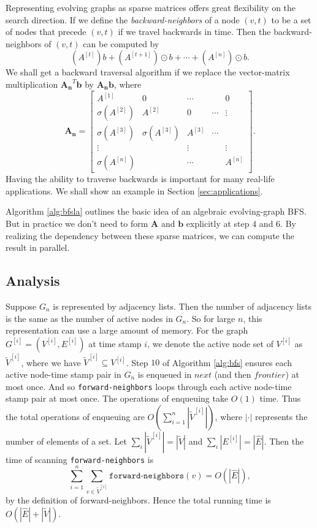 \documentclass[11pt,conference,compsocconf]{IEEEtran}
\theoremstyle{definition}
\begin{document}
Representing evolving graphs as sparse matrices offers great flexibility
on the search direction. If we define the \emph{backward-neighbors} of a
node $(v,t)$ to be a set of nodes that precede $(v,t)$ if we travel backwards
in time. Then the backward-neighbors of $(v,t)$ can be computed by
\begin{equation}
\label{eq:backward}
(A^{[t]})b + (A^{[t+1]})\odot b + \cdots + (A^{[n]})\odot b.
\end{equation}
We shall get a backward traversal algorithm if we replace
the vector-matrix multiplication $\bm{A_n}^T\bm{b}$
by $\bm{A_n}\bm{b}$, where
\[
\bm{A_n} =
\begin{bmatrix}
A^{[1]} &   0            & \cdots  &  & 0 \\
\sigma(A^{[2]}) & A^{[2]} & 0         &\cdots  & \vdots \\
\sigma(A^{[3]}) & \sigma(A^{[3]}) & A^{[3]} & \cdots \\
   \vdots              &                              &      \vdots            &  &  \vdots \\
\sigma(A^{[n]}) &                  &       \cdots                      &  & A^{[n]}
\end{bmatrix}.
\]
Having the ability to traverse backwards is important for many real-life applications.
We shall show an example in Section \ref{sec:applications}.

Algorithm \ref{alg:bfsla} outlines the basic idea of an algebraic evolving-graph BFS.
But in practice we don't need to form $\bm{A}$ and $\bm{b}$ explicitly at step $4$ and $6$. By realizing the dependency between these sparse matrices,
we can compute  the result in parallel.

\subsection{Analysis}
\label{sec:analysis}

Suppose $G_n$ is represented by adjacency lists.
Then the number of adjacency lists is the same as the number
of active nodes in $G_n$. So for large $n$, this representation
can use a large amount of memory.
For the graph $G^{[i]} = (V^{[i]}, E^{[i]})$ at time stamp $i$,
we denote the active node set of $V^{[i]}$ as $\tilde V^{[i]}$,
where we have $\tilde V^{[i]} \subseteq V^{[i]}$.
Step $10$ of  Algorithm \ref{alg:bfs} ensures each active node-time stamp pair in $G_n$ is enqueued in $next$ (and then $frontier$) at most once.
And so \texttt{forward-neighbors} loops through each
active node-time stamp pair at most once.
The operations of enqueuing take $O(1)$ time.
Thus the total operations of enqueuing are
$O(\sum_{i=1}^n|\tilde V^{[i]}|)$, where $|\cdot|$ represents the number of elements of a set.  Let $\sum_i |\tilde V^{[i]}| = |\tilde V|$ and $\sum_i |E^{[i]}| = |\hat E|$.
Then the time of scanning
\texttt{forward-neighbors} is
\[
\sum_{i=1}^n\sum_{v \in \tilde V^{[i]}} \texttt{forward-neighbors}(v) =
O(|\hat E|),
\]
by the definition of forward-neighbors.
Hence the total running time is $O(|\hat E|+ |\tilde V|)$.
\end{document}
